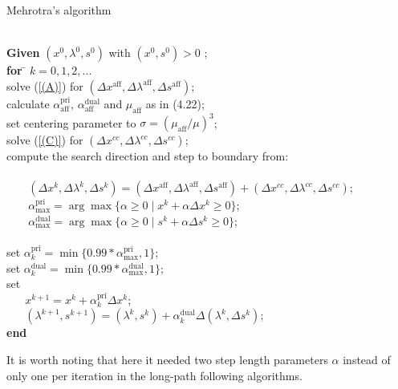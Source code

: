 \documentclass[a4paper,10 pt,titlepage,twoside]{book}
\theoremstyle{plain}
\theoremstyle{definition}
\theoremstyle{remark}
\begin{document}
\begin{algorithm}[H]\caption{Mehrotra's algorithm}
\begin{tabbing}
	\\
	\textbf{Given} $(x^{0}, \lambda^{0}, s^{0})$ with $(x^{0}, s^{0})> 0$ ; \\
	\textbf{for} \= $k = 0, 1, 2,...$ \\
	\> solve (\ref{(A)}) for $(\Delta x^{\text{aff}},\Delta \lambda^{\text{aff}},\Delta s^{\text{aff}})$;\\
	\> calculate $\alpha_{\text{aff}}^{\text{pri}}$, $\alpha_{\text{aff}}^{\text{dual}}$ and $\mu_{\text{aff}}$ as in (4.22);\\
	\> set centering parameter to $\sigma = (\mu_{\text{aff}}/\mu)^{3}$; \\
	\> solve (\ref{(C)}) for $(\Delta x^{cc},\Delta \lambda^{cc},\Delta s^{cc})$;\\
	\> compute the search direction and step to boundary from: \\
	\> \\
	\> $\;\;\;\;\;\;\;(\Delta x^{k},\Delta \lambda^{k},\Delta s^{k})=(\Delta x^{\text{aff}},\Delta \lambda^{\text{aff}},\Delta s^{\text{aff}})+(\Delta x^{cc},\Delta  \lambda^{cc},\Delta s^{cc})$;\\
	\> $\;\;\;\;\;\;\;\alpha_{\text{max}}^{\text{pri}}=\arg\max\{\alpha\geq0\;|\;x^{k} +\alpha\Delta x^{k}\geq 0\}$;\\
	\> $\;\;\;\;\;\;\;\alpha_{\text{max}}^{\text{dual}}=\arg\max\{\alpha\geq0\;|\;s^{k} +\alpha\Delta s^{k}\geq 0\}$;\\
	\>\\
	\> set $\alpha_{k}^{\text{pri}}=\min\{0.99\ast\alpha_{\text{max}}^{\text{pri}},1\}$;\\
	\> set $\alpha_{k}^{\text{dual}}=\min\{0.99\ast\alpha_{\text{max}}^{\text{dual}},1\}$;\\
	\> set\\
	\> $\;\;\;\;\;\;x^{k+1} = x^{k} + \alpha_{k}^{\text{pri}}\Delta x^{k}$;\\
	\>$\;\;\;\;\;\;(\lambda^{k+1},s^{k+1}) = (\lambda^{k},s^{k}) + \alpha_{k}^{\text{dual}}\Delta (\lambda^{k},\Delta s^{k})$;\\
\textbf{end}
\end{tabbing}
\end{algorithm}
It is worth noting that here it needed two step length parameters $\alpha$ instead of only one per iteration in the long-path following algorithms.
\newpage
\end{document}
